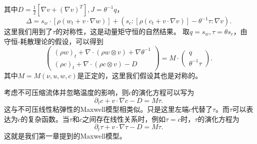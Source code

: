 \documentclass{article}
\begin{document}
	其中$D = \frac{1}{2} [\nabla v + (\nabla v)^T], J =\theta^{-1} q $，
	\begin{equation*}
		\Delta = s_w \cdot [\rho (w_t + v \cdot \nabla w)] + (s_c:[\rho (c_t + v \cdot \nabla v)] - \theta^{-1} \tau : \nabla v) .
	\end{equation*}
	这里我们用到了$\tau$的对称性，这是动量矩守恒的自然结果\cite{}。
	取$q =s_w,\tau = \theta s_c$，由守恒-耗散理论的假设，可以得到
	\begin{equation*}
		\left( \begin{array}{c} 
			(\rho w)_t +  \nabla \cdot (\rho w \otimes v)  + \nabla \theta^{-1} \\
			(\rho c)_t +  \nabla \cdot (\rho c \otimes v)  - D
		\end{array} \right) = M \cdot
		\left( \begin{array}{c} 
			q \\ \theta^{-1} \tau
		\end{array}\right).
	\end{equation*}
	其中$M=M(\nu,u,w,c)$是正定的，这里我们假设其也是对称的。

	考虑不可压缩流体并忽略温度的影响，则$c$的演化方程可以写为
	\begin{equation*}
		\partial_t c + v \cdot \nabla c - D = M \tau.
	\end{equation*}
	这与不可压线性粘弹性的Maxwell模型相类似。只是这里左端$c$代替了$\tau$。而$\tau$可以表达为$c$的复杂函数。当$\tau$和$c$之间存在线性关系时，例如$\tau = c$时，$\tau$的演化方程为
	\begin{equation*}
		\partial_t \tau+ v \cdot \nabla \tau - D = M \tau.
	\end{equation*}
	这就是我们第一章提到的Maxwell模型。
\end{document}
